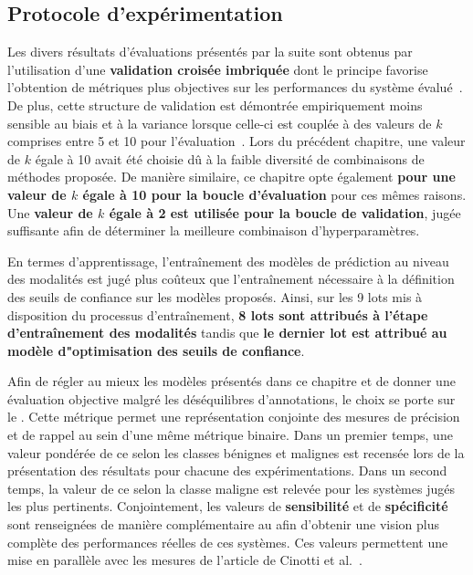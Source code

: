 \subsection{Protocole d’expérimentation}
Les divers résultats d'évaluations présentés par la suite sont obtenus par l'utilisation d'une \textbf{validation croisée imbriquée} dont le principe favorise l'obtention de métriques plus objectives sur les performances du système évalué~\cite{Cawley2010}. De plus, cette structure de validation est démontrée empiriquement moins sensible au biais et à la variance lorsque celle-ci est couplée à des valeurs de $k$ comprises entre 5 et 10 pour l'évaluation~\cite{James2000}. Lors du précédent chapitre, une valeur de $k$ égale à 10 avait été choisie dû à la faible diversité de combinaisons de méthodes proposée. De manière similaire, ce chapitre opte également \textbf{pour une valeur de $k$ égale à 10 pour la boucle d'évaluation} pour ces mêmes raisons. Une \textbf{valeur de $k$ égale à 2 est utilisée pour la boucle de validation}, jugée suffisante afin de déterminer la meilleure combinaison d'hyperparamètres.\par

En termes d'apprentissage, l'entraînement des modèles de prédiction au niveau des modalités est jugé plus coûteux que l'entraînement nécessaire à la définition des seuils de confiance sur les modèles proposés. Ainsi, sur les 9 lots mis à disposition du processus d'entraînement, \textbf{8 lots sont attribués à l'étape d'entraînement des modalités} tandis que \textbf{le dernier lot est attribué au modèle d"optimisation des seuils de confiance}.\par

Afin de régler au mieux les modèles présentés dans ce chapitre et de donner une évaluation objective malgré les déséquilibres d'annotations, le choix se porte sur le \textbf{\fscore{}}. Cette métrique permet une représentation conjointe des mesures de précision et de rappel au sein d'une même métrique binaire. Dans un premier temps, une valeur pondérée de ce \fscore{} selon les classes bénignes et malignes est recensée lors de la présentation des résultats pour chacune des expérimentations. Dans un second temps, la valeur de ce \fscore{} selon la classe maligne est relevée pour les systèmes jugés les plus pertinents. Conjointement, les valeurs de \textbf{sensibilité} et de \textbf{spécificité} sont renseignées de manière complémentaire au \fscore{} afin d'obtenir une vision plus complète des performances réelles de ces systèmes. Ces valeurs permettent une mise en parallèle avec les mesures de l'article de Cinotti et al.~\cite{Cinotti2016}.\par

